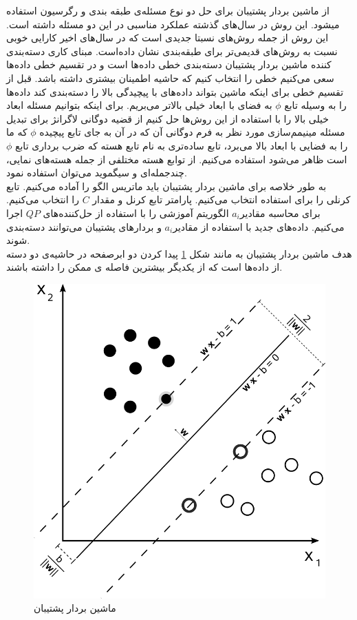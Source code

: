 \noindent
از ماشین بردار پشتیبان برای حل دو نوع مسئله‌ی طبقه بندی و رگرسیون استفاده میشود. این روش در سال‌های گذشته عملکرد مناسبی در این دو مسئله داشته است.
این روش از جمله روش‌های نسبتا جدیدی است که در سال‌های اخیر کارایی خوبی نسبت به روش‌های قدیمی‌تر برای طبقه‌بندی نشان داده‌است. مبنای کاری دسته‌بندی کننده ماشین بردار پشتیبان دسته‌بندی خطی داده‌ها است و در تقسیم خطی داده‌ها سعی می‌کنیم خطی را انتخاب کنیم که حاشیه اطمینان بیشتری داشته باشد. قبل از تقسیم خطی برای اینکه ماشین بتواند داده‌های با پیچیدگی بالا را دسته‌بندی کند داده‌ها را به وسیله تابع $\phi$ به فضای با ابعاد خیلی بالاتر می‌بریم. برای اینکه بتوانیم مسئله ابعاد خیلی بالا را با استفاده از این روش‌ها حل کنیم از قضیه دوگانی لاگرانژ برای تبدیل مسئله مینیمم‌سازی مورد نظر به فرم دوگانی آن که در آن به جای تابع پیچیده $\phi$ که ما را به فضایی با ابعاد بالا می‌برد، تابع ساده‌تری به نام تابع هسته که ضرب برداری تابع $\phi$ است ظاهر می‌شود استفاده می‌کنیم. از توابع هسته مختلفی از جمله هسته‌های نمایی، چندجمله‌ای و سیگموید می‌توان استفاده نمود.
\\
به طور خلاصه برای ماشین بردار پشتیبان باید 
ماتریس الگو را آماده می‌کنیم. تابع کرنلی را برای استفاده انتخاب می‌کنیم. پارامتر تابع کرنل و مقدار $C$ را انتخاب می‌کنیم. برای محاسبه مقادیر$a_i$ الگوریتم آموزشی را با استفاده از حل‌کننده‌های $QP$ اجرا می‌کنیم. داده‌های جدید با استفاده از مقادیر$a_i$ و بردارهای پشتیبان می‌توانند دسته‌بندی شوند.
\\
هدف ماشین بردار پشتیبان به مانند شکل \ref{fig:svm} پیدا کردن دو ابرصفحه در حاشیه‌ی دو دسته از داده‌ها است که از یکدیگر بیشترین فاصله ی ممکن را داشته باشند.

\begin{figure}[ht!]
    \begin{center}
        \includegraphics[width=12cm]{images/svm.png}
    \end{center}
    \caption[ماشین بردار پشتیبان]{ماشین بردار پشتیبان}
    \label{fig:svm}
    \end{figure}

